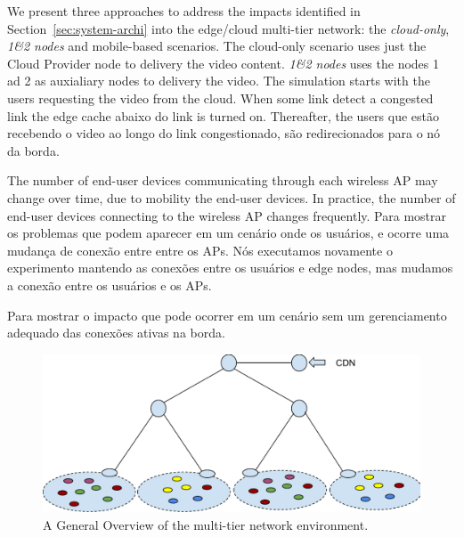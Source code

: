 We present three approaches to address the impacts identified in Section~\ref{sec:system-archi} into the edge/cloud multi-tier network: the \textit{cloud-only}, \textit{1\&2 nodes} and mobile-based scenarios. The cloud-only scenario uses just the Cloud Provider node to delivery the video content. \textit{1\&2 nodes} uses the nodes 1 ad 2 as auxialiary nodes to delivery the video. The simulation starts with the users requesting the video from the cloud. When some link detect a congested link  the edge cache abaixo do link is turned on. Thereafter, the users que estão recebendo o video ao longo do link congestionado, são redirecionados para o nó da borda. 

The number of end-user devices communicating through each wireless AP may change over time, due to mobility the end-user devices. In practice, the number of end-user devices connecting to the wireless AP changes frequently. 
Para mostrar os problemas que podem aparecer em um cenário onde os usuários, e ocorre uma mudança de conexão entre entre os APs. Nós executamos novamente o experimento mantendo as conexões entre os usuários e edge nodes, mas mudamos a conexão entre os usuários e os APs. 

Para mostrar o impacto que pode ocorrer em um cenário sem um gerenciamento adequado das conexões ativas na borda.


\begin{figure}
    \centering
    \includegraphics[width=0.9\linewidth]{images/exp-setup-scenario.pdf}
    \caption{A General Overview of the multi-tier network environment.}
    \label{fig:exp-setup-scenario}
\end{figure}



